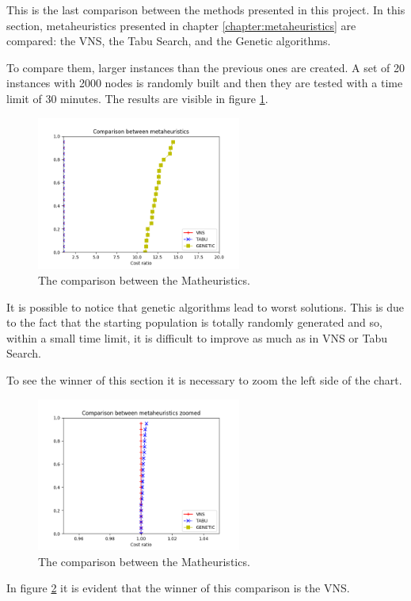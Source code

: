 This is the last comparison between the methods presented in this project. In this section, metaheuristics presented in chapter \ref{chapter:metaheuristics} are compared: the VNS, the Tabu Search, and the Genetic algorithms.

To compare them, larger instances than the previous ones are created. A set of 20 instances with 2000 nodes is randomly built and then they are tested with a time limit of 30 minutes. The results are visible in figure \ref{fig:result-meta}.

\begin{figure}[h]
	\centering
	\includegraphics[width=0.6\textwidth]{images/final_meta.png}
	\caption{The comparison between the Matheuristics.}
	\label{fig:result-meta}
\end{figure}

It is possible to notice that genetic algorithms lead to worst solutions. This is due to the fact that the starting population is totally randomly generated and so, within a small time limit, it is difficult to improve as much as in VNS or Tabu Search.

To see the winner of this section it is necessary to zoom the left side of the chart. 

\begin{figure}[h]
	\centering
	\includegraphics[width=0.6\textwidth]{images/final_meta_zoom.png}
	\caption{The comparison between the Matheuristics.}
	\label{fig:result-meta-zoom}
\end{figure}

In figure \ref{fig:result-meta-zoom} it is evident that the winner of this comparison is the VNS.